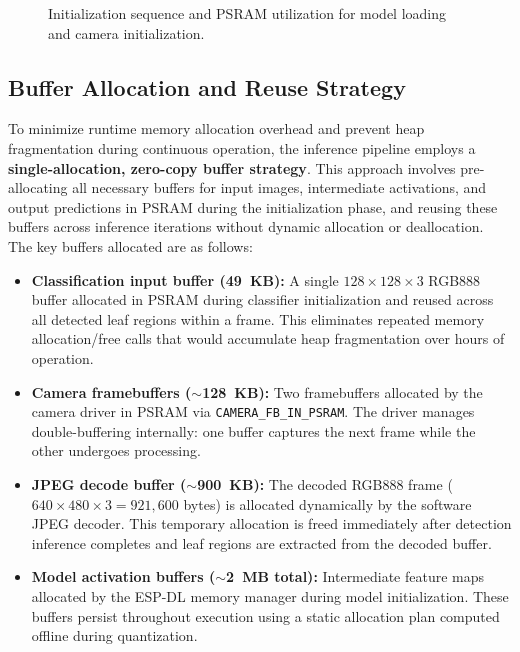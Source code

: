 \begin{figure}[htbp]
\caption{Initialization sequence and PSRAM utilization for model loading and camera initialization.}
\label{fig:initialization_sequence}
\end{figure}


\subsection{Buffer Allocation and Reuse Strategy}
\label{subsec:buffer_allocation}

To minimize runtime memory allocation overhead and prevent heap fragmentation during continuous operation, the inference pipeline employs a \textbf{single-allocation, zero-copy buffer strategy}. This approach involves pre-allocating all necessary buffers for input images, intermediate activations, and output predictions in PSRAM during the initialization phase, and reusing these buffers across inference iterations without dynamic allocation or deallocation. The key buffers allocated are as follows:

\begin{itemize}
    \item \textbf{Classification input buffer (49~KB):} A single $128 \times 128 \times 3$ RGB888 buffer allocated in PSRAM during classifier initialization and reused across all detected leaf regions within a frame. This eliminates repeated memory allocation/free calls that would accumulate heap fragmentation over hours of operation.
    \item \textbf{Camera framebuffers ($\sim$128~KB):} Two framebuffers allocated by the camera driver in PSRAM via \texttt{CAMERA\_FB\_IN\_PSRAM}. The driver manages double-buffering internally: one buffer captures the next frame while the other undergoes processing.
    \item \textbf{JPEG decode buffer ($\sim$900~KB):} The decoded RGB888 frame ($640 \times 480 \times 3 = 921{,}600$ bytes) is allocated dynamically by the software JPEG decoder. This temporary allocation is freed immediately after detection inference completes and leaf regions are extracted from the decoded buffer.
    \item \textbf{Model activation buffers ($\sim$2~MB total):} Intermediate feature maps allocated by the ESP-DL memory manager during model initialization. These buffers persist throughout execution using a static allocation plan computed offline during quantization.
\end{itemize}

